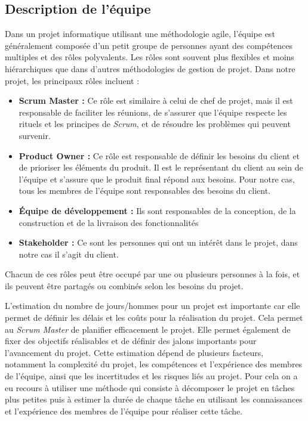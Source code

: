 \documentclass{article}
\begin{document}
\subsection{Description de l'équipe} \label{sec:description-equipe}
Dans un projet informatique utilisant une méthodologie agile, 
l'équipe est généralement composée d'un petit groupe de personnes ayant des compétences multiples et des rôles polyvalents. Les rôles sont souvent plus flexibles et moins hiérarchiques que dans d'autres méthodologies de gestion de projet. Dans notre projet, 
les principaux rôles incluent :
\begin{itemize}

    \item \textbf{Scrum Master :} Ce rôle est similaire à celui de chef de projet, mais il est responsable de faciliter les réunions, de s'assurer que l'équipe respecte les rituels et les principes de \textit{Scrum}, et de résoudre les problèmes qui peuvent survenir.
    \item \textbf{Product Owner :} Ce rôle est responsable de définir les besoins du client et de prioriser les éléments du produit. Il est le représentant du client au sein de l'équipe et s'assure que le produit final répond aux besoins. Pour notre cas, tous les membres de l’équipe sont responsables des besoins du client.
    \item \textbf{Équipe de développement :} Ils sont responsables de la conception, de la construction et de la livraison des fonctionnalités
    \item \textbf{Stakeholder :} Ce sont les personnes qui ont un intérêt dans le projet, dans notre cas il s’agit du client.

\end{itemize}
Chacun de ces rôles peut être occupé par une ou plusieurs personnes à la fois, et ils peuvent être partagés ou combinés selon les besoins du projet.


L'estimation du nombre de jours/hommes pour un projet est importante car elle permet de définir les délais et les coûts pour la réalisation du projet. Cela permet au \textit{Scrum Master} de planifier efficacement le projet. Elle permet également de fixer des objectifs réalisables et de définir des jalons importants pour l'avancement du projet. 
Cette estimation dépend de plusieurs facteurs, notamment la complexité du projet, les compétences et l'expérience des membres de l'équipe, ainsi que les incertitudes et les risques liés au projet. Pour cela on a eu recours à utiliser une méthode qui consiste à décomposer le projet en tâches plus petites puis à estimer la durée de chaque tâche en utilisant les connaissances et l'expérience des membres de l'équipe pour réaliser cette tâche.
\end{document}
